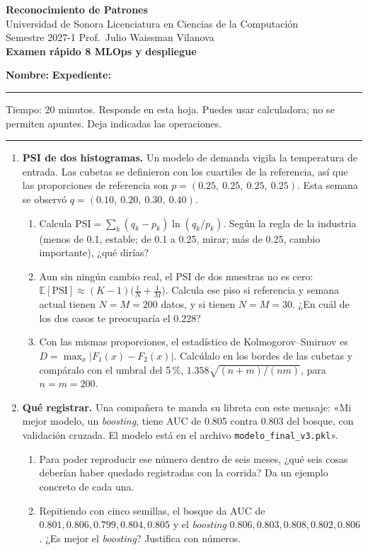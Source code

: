 \documentclass[11pt]{article}
\newcommand{\E}{\mathbb{E}}
\newcommand{\encabezado}[2]{%
\begin{center}
{\large\bfseries Reconocimiento de Patrones}\\[2pt]
Universidad de Sonora \textperiodcentered{} Licenciatura en Ciencias de la Computación\\
Semestre 2027-1 \textperiodcentered{} Prof.\ Julio Waissman Vilanova\\[10pt]
{\Large\bfseries #1}%
\ifdefined\tipodoc\\[4pt]{\large\itshape\tipodoc}\fi
\end{center}
\ifdefined\tipodoc\else
\vspace{6pt}
\textbf{Nombre:} \hrulefill\quad \textbf{Expediente:} \rule{3.5cm}{0.4pt}\par
\vspace{6pt}
\fi
#2
\par\medskip\hrule\medskip
}
\newcommand{\espacio}[1]{\par\vspace{#1}}
\newcommand{\nuevapagina}{\newpage}
\begin{document}
\encabezado{Examen rápido 8 \textperiodcentered{} MLOps y despliegue}{%
Tiempo: 20 minutos. Responde en esta hoja. Puedes usar calculadora; no se permiten apuntes. Deja indicadas las operaciones.}

\begin{enumerate}

\item \textbf{PSI de dos histogramas.} Un modelo de demanda vigila la temperatura de entrada. Las cubetas se definieron con los cuartiles de la referencia, así que las proporciones de referencia son $p = (0.25,\ 0.25,\ 0.25,\ 0.25)$. Esta semana se observó $q = (0.10,\ 0.20,\ 0.30,\ 0.40)$.
\begin{enumerate}
  \item Calcula $\text{PSI} = \sum_k (q_k - p_k)\ln(q_k/p_k)$. Según la regla de la industria (menos de 0.1, estable; de 0.1 a 0.25, mirar; más de 0.25, cambio importante), ¿qué dirías?
  \espacio{3.2cm}

  \item Aun sin ningún cambio real, el PSI de dos muestras no es cero: $\E[\text{PSI}] \approx (K - 1)\big(\frac1N + \frac1M\big)$. Calcula ese piso si referencia y semana actual tienen $N = M = 200$ datos, y si tienen $N = M = 30$. ¿En cuál de los dos casos te preocuparía el 0.228?
  \espacio{2.8cm}

  \item Con las mismas proporciones, el estadístico de Kolmogorov–Smirnov es $D = \max_x |F_1(x) - F_2(x)|$. Calcúlalo en los bordes de las cubetas y compáralo con el umbral del 5\,\%, $1.358\sqrt{(n+m)/(nm)}$, para $n = m = 200$.
  \espacio{2.8cm}
\end{enumerate}

\nuevapagina
\item \textbf{Qué registrar.} Una compañera te manda su libreta con este mensaje: «Mi mejor modelo, un \textit{boosting}, tiene AUC de 0.805 contra 0.803 del bosque, con validación cruzada. El modelo está en el archivo \texttt{modelo\_final\_v3.pkl}».
\begin{enumerate}
  \item Para poder reproducir ese número dentro de seis meses, ¿qué seis cosas deberían haber quedado registradas con la corrida? Da un ejemplo concreto de cada una.
  \espacio{3.5cm}

  \item Repitiendo con cinco semillas, el bosque da AUC de $0.801, 0.806, 0.799, 0.804, 0.805$ y el \textit{boosting} $0.806, 0.803, 0.808, 0.802, 0.806$. ¿Es mejor el \textit{boosting}? Justifica con números.
  \espacio{2.8cm}


\end{enumerate}
\end{enumerate}
\end{document}
